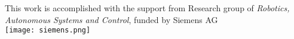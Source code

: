 \vspace*{\fill}
\noindent
\begin{minipage}{1\textwidth}
\begin{center}
{\large	{This work is accomplished with the support from Research group of \textit{Robotics, Autonomous Systems and Control}, funded by  Siemens AG} \\
\vspace{1cm}
\texttt{[image: siemens.png]}
}
\end{center}
\end{minipage}
\vfill